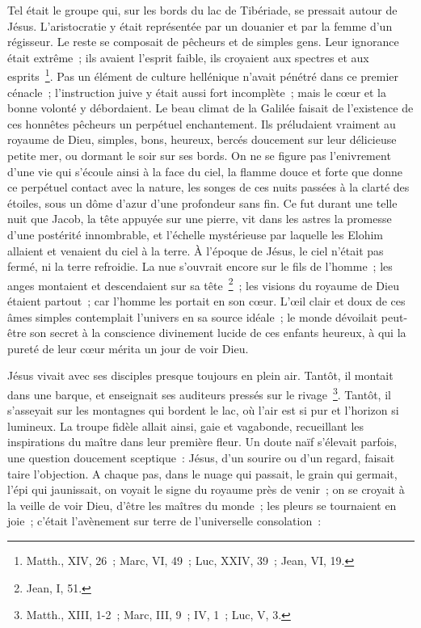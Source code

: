\documentclass[french,twoside]{book} %
\newcommand\chaptercont{} %
\begin{document}
\chaptercont
\noindent Tel était le groupe qui, sur les bords du lac de Tibériade, se pressait autour de Jésus. L’aristocratie y était représentée par un douanier et par la femme d’un régisseur. Le reste se composait de pêcheurs et de simples gens. Leur ignorance était extrême ; ils avaient l’esprit faible, ils croyaient aux spectres et aux esprits \footnote{Matth., XIV, 26 ; Marc, VI, 49 ; Luc, XXIV, 39 ; Jean, VI, 19.}. Pas un élément de culture hellénique n’avait pénétré dans ce premier cénacle ; l’instruction juive y était aussi fort incomplète ; mais le cœur et la bonne volonté y débordaient. Le beau climat de la Galilée faisait de l’existence de ces honnêtes pêcheurs un perpétuel enchantement. Ils préludaient vraiment au royaume de Dieu, simples, bons, heureux, bercés doucement sur leur délicieuse petite mer, ou dormant le soir sur ses bords. On ne se figure pas l’enivrement d’une vie qui s’écoule ainsi à la face du ciel, la flamme douce et forte que donne ce perpétuel contact avec la nature, les songes de ces nuits passées à la clarté des étoiles, sous un dôme d’azur d’une profondeur sans fin. Ce fut durant une telle nuit que Jacob, la tête appuyée sur une pierre, vit dans les astres la promesse d’une postérité innombrable, et l’échelle mystérieuse par laquelle les Elohim allaient et venaient du ciel à la terre. À l’époque de Jésus, le ciel n’était pas fermé, ni la terre refroidie. La nue s’ouvrait encore sur le fils de l’homme ; les anges montaient et descendaient sur sa tête \footnote{Jean, I, 51.} ; les visions du royaume de Dieu étaient partout ; car l’homme les portait en son cœur. L’œil clair et doux de ces âmes simples contemplait l’univers en sa source idéale ; le monde dévoilait peut-être son secret à la conscience divinement lucide de ces enfants heureux, à qui la pureté de leur cœur mérita un jour de voir Dieu.\par
Jésus vivait avec ses disciples presque toujours en plein air. Tantôt, il montait dans une barque, et enseignait ses auditeurs pressés sur le rivage \footnote{Matth., XIII, 1-2 ; Marc, III, 9 ; IV, 1 ; Luc, V, 3.}. Tantôt, il s’asseyait sur les montagnes qui bordent le lac, où l’air est si pur et l’horizon si lumineux. La troupe fidèle allait ainsi, gaie et vagabonde, recueillant les inspirations du maître dans leur première fleur. Un doute naïf s’élevait parfois, une question doucement sceptique : Jésus, d’un sourire ou d’un regard, faisait taire l’objection. A chaque pas, dans le nuage qui passait, le grain qui germait, l’épi qui jaunissait, on voyait le signe du royaume près de venir ; on se croyait à la veille de voir Dieu, d’être les maîtres du monde ; les pleurs se tournaient en joie ; c’était l’avènement sur terre de l’universelle consolation :\par
\end{document}
